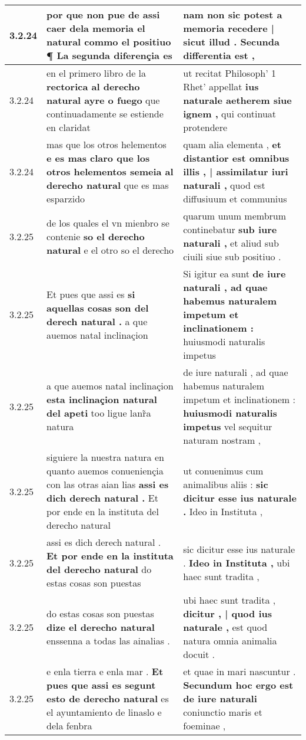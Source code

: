 \begin{tabular}{|p{1cm}|p{6.5cm}|p{6.5cm}|}
3.2.24 & por que non pue de \textbf{ assi caer dela memoria el natural commo el positiuo ¶ } La segunda diferençia es & nam non sic potest \textbf{ a memoria recedere | sicut illud . } Secunda differentia est , \\\hline
3.2.24 & en el primero libro de la \textbf{ rectorica al derecho natural ayre o fuego } que continuadamente se estiende en claridat & ut recitat Philosoph’ 1 Rhet’ appellat \textbf{ ius naturale aetherem siue ignem , } qui continuat protendere \\\hline
3.2.24 & mas que los otros helementos \textbf{ e es mas claro que los otros helementos semeia al derecho natural } que es mas esparzido & quam alia elementa , \textbf{ et distantior est omnibus illis , | assimilatur iuri naturali , } quod est diffusiuum et communius \\\hline
3.2.25 & de los quales el vn mienbro se contenie \textbf{ so el derecho natural } e el otro so el derecho & quarum unum membrum continebatur \textbf{ sub iure naturali , } et aliud sub ciuili siue sub positiuo . \\\hline
3.2.25 & Et pues que assi es \textbf{ si aquellas cosas son del derech natural . } a que auemos natal inclinaçion & Si igitur ea sunt \textbf{ de iure naturali , ad quae habemus naturalem impetum et inclinationem : } huiusmodi naturalis impetus \\\hline
3.2.25 & a que auemos natal inclinaçion \textbf{ esta inclinaçion natural del apeti } too ligue lanr̃a natura & de iure naturali , ad quae habemus naturalem impetum et inclinationem : \textbf{ huiusmodi naturalis impetus } vel sequitur naturam nostram , \\\hline
3.2.25 & siguiere la nuestra natura en quanto auemos conueniençia con las otras aian lias \textbf{ assi es dich derech natural . } Et por ende en la instituta del derecho natural & ut conuenimus cum animalibus aliis : \textbf{ sic dicitur esse ius naturale . } Ideo in Instituta , \\\hline
3.2.25 & assi es dich derech natural . \textbf{ Et por ende en la instituta del derecho natural } do estas cosas son puestas & sic dicitur esse ius naturale . \textbf{ Ideo in Instituta , } ubi haec sunt tradita , \\\hline
3.2.25 & do estas cosas son puestas \textbf{ dize el derecho natural } enssenna a todas las ainalias . & ubi haec sunt tradita , \textbf{ dicitur , | quod ius naturale , } est quod natura omnia animalia docuit . \\\hline
3.2.25 & e enla tierra e enla mar . \textbf{ Et pues que assi es segunt esto de derecho natural } es el ayuntamiento de linaslo e dela fenbra & et quae in mari nascuntur . \textbf{ Secundum hoc ergo est de iure naturali } coniunctio maris et foeminae , \\\hline

\end{tabular}
